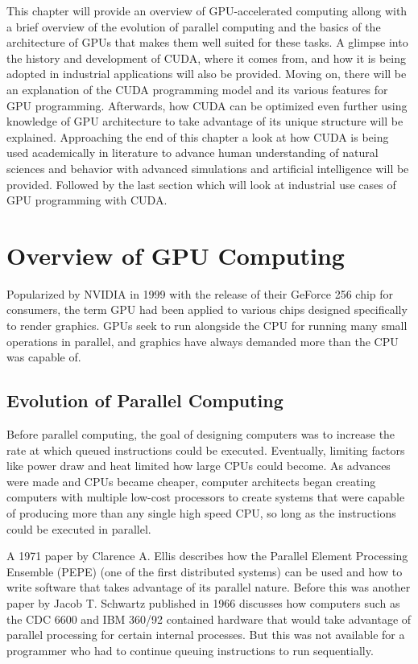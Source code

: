 \documentclass[11pt]{report}
\begin{document}
This chapter will provide an overview of GPU-accelerated computing allong with a brief overview of the evolution of parallel computing and the basics of the architecture of GPUs that makes them well suited for these tasks. A glimpse into the history and development of CUDA, where it comes from, and how it is being adopted in industrial applications will also be provided. Moving on, there will be an explanation of the CUDA programming model and its various features for GPU programming. Afterwards, how CUDA can be optimized even further using knowledge of GPU architecture to take advantage of its unique structure will be explained. Approaching the end of this chapter a look at how CUDA is being used academically in literature to advance human understanding of natural sciences and behavior with advanced simulations and artificial intelligence will be provided. Followed by the last section which will look at industrial use cases of GPU programming with CUDA.

\section{Overview of GPU Computing}
    Popularized by NVIDIA in 1999 with the release of their GeForce 256 chip for consumers\cite{FAMOUS_CHIPS}, the term GPU had been applied to various chips designed specifically to render graphics. GPUs seek to run alongside the CPU for running many small operations in parallel, and graphics have always demanded more than the CPU was capable of.
    
    \subsection{Evolution of Parallel Computing}
    Before parallel computing, the goal of designing computers was to increase the rate at which queued instructions could be executed. Eventually, limiting factors like power draw and heat limited how large CPUs could become. As advances were made and CPUs became cheaper, computer architects began creating computers with multiple low-cost processors to create systems that were capable of producing more than any single high speed CPU, so long as the instructions could be executed in parallel. 
    
    A 1971 paper by Clarence A. Ellis\cite{Parallel_Techniques} describes how the Parallel Element Processing Ensemble (PEPE) (one of the first distributed systems) can be used and how to write software that takes advantage of its parallel nature. Before this was another paper by Jacob T. Schwartz published in 1966\cite{LPC} discusses how computers such as the CDC 6600 and IBM 360/92 contained hardware that would take advantage of parallel processing for certain internal processes. But this was not available for a programmer who had to continue queuing instructions to run sequentially.
\end{document}
